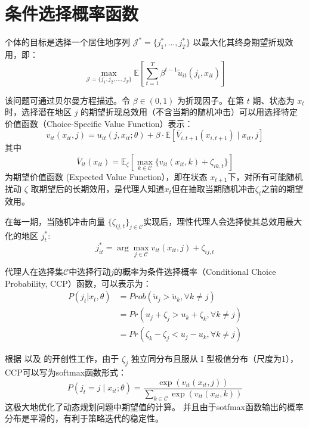 \documentclass[
  a4paper,
  zihao=-4,
  fontset=mac,
  AutoFakeBold,
  AutoFakeSlant,
  oneside]{ctexbook}
\begin{document}
\section{条件选择概率函数}

个体的目标是选择一个居住地序列 $\mathcal{J}^* = \{j_1^*, \dots, j_T^*\}$ 以最大化其终身期望折现效用，即：
\begin{equation}
  \max_{\mathcal{J}=\{j_1,j_2,\ldots,j_T\}} \mathbb{E} \left[ \sum_{t=1}^{T} \beta^{t-1} \tilde{u}_{it}(j_t,x_{it}) \right]
\end{equation}

该问题可通过贝尔曼方程描述。令 $\beta \in (0,1)$ 为折现因子。在第 $t$ 期、状态为 $x_t$ 时，选择潜在地区 $j$ 的期望折现总效用（不含当期的随机冲击）可以用选择特定价值函数（Choice-Specific Value Function）表示：
\begin{equation}
v_{it}(x_{it}, j) = u_{it}(j, x_{it}; \theta) + \beta \cdot \mathbb{E} \left[\bar{V}_{i,t+1}(x_{i,t+1}) \mid x_{it}, j \right]
\end{equation}
其中
\begin{equation}
\bar{V}_{it}(x_{it}) = \mathbb{E}_{\zeta} \left[ \max_{k \in \mathcal{C}} \{ v_{it}(x_{it}, k) + \zeta_{ik,t} \} \right]
\end{equation}
为期望价值函数 (Expected Value Function），即在状态 $x_{t+1}$下，对所有可能随机扰动 $\zeta$ 取期望后的长期效用，是代理人知道$x_t$但在抽取当期随机冲击$\zeta_t$之前的期望效用。

在每一期，当随机冲击向量 $\{\zeta_{ij,t}\}_{j \in \mathcal{C}}$实现后，理性代理人会选择使其总效用最大化的地区 $j_t^*$:
\begin{equation}
j_{it}^* = \arg\max_{j \in \mathcal{C}} { v_{it}(x_{it}, j) + \zeta_{ij,t} }
\end{equation}

代理人在选择集$\mathcal{C}$中选择行动$j$的概率为条件选择概率（Conditional Choice Probability, CCP）函数，可以表示为：
\begin{equation}
\begin{split}
    P(j_t|x_t,\theta)&=Prob(\tilde u_j > \tilde u_k, \forall k \neq j)
    \\&=Pr(u_j+\zeta_j>u_k+\zeta_k, \forall k \neq j)
    \\&=Pr(\zeta_k-\zeta_j<u_j-u_k, \forall k \neq j)
\end{split}  
\label{eq:C中地点选择j的概率}
\end{equation}


根据\textcite{rustOptimalReplacementGMC1987} 以及\textcite{hotzConditionalChoiceProbabilities1993} 的开创性工作，由于 $\zeta_j$ 独立同分布且服从 I 型极值分布（尺度为1），CCP可以写为softmax函数形式：
\begin{equation}
P(j_t = j \mid x_{it}; \theta) = \frac{\exp(v_{it}(x_{it}, j))}{\sum_{k \in \mathcal{C}} \exp(v_{it}(x_{it}, k))}
\label{eq:地点选择概率}
\end{equation}
这极大地优化了动态规划问题中期望值的计算。
并且由于sotfmax函数输出的概率分布是平滑的，有利于策略迭代的稳定性。
\end{document}
